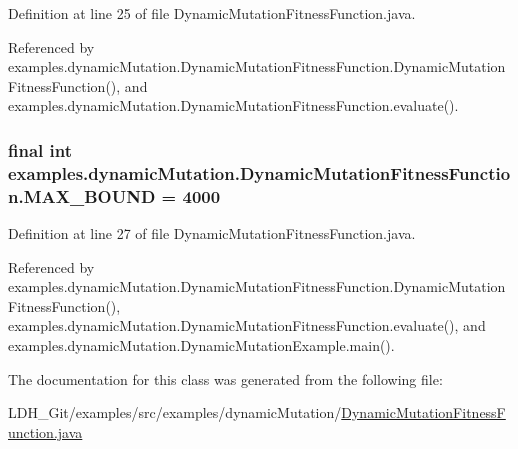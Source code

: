 Definition at line 25 of file Dynamic\-Mutation\-Fitness\-Function.\-java.



Referenced by examples.\-dynamic\-Mutation.\-Dynamic\-Mutation\-Fitness\-Function.\-Dynamic\-Mutation\-Fitness\-Function(), and examples.\-dynamic\-Mutation.\-Dynamic\-Mutation\-Fitness\-Function.\-evaluate().

\hypertarget{classexamples_1_1dynamic_mutation_1_1_dynamic_mutation_fitness_function_a72501ebb1ccd6fcd85c2b480c6c41907}{
\subsubsection[{M\-A\-X\-\_\-\-B\-O\-U\-N\-D}]{\setlength{\rightskip}{0pt plus 5cm}final int examples.\-dynamic\-Mutation.\-Dynamic\-Mutation\-Fitness\-Function.\-M\-A\-X\-\_\-\-B\-O\-U\-N\-D = 4000\hspace{0.3cm}{\ttfamily [static]}}}\label{classexamples_1_1dynamic_mutation_1_1_dynamic_mutation_fitness_function_a72501ebb1ccd6fcd85c2b480c6c41907}


Definition at line 27 of file Dynamic\-Mutation\-Fitness\-Function.\-java.



Referenced by examples.\-dynamic\-Mutation.\-Dynamic\-Mutation\-Fitness\-Function.\-Dynamic\-Mutation\-Fitness\-Function(), examples.\-dynamic\-Mutation.\-Dynamic\-Mutation\-Fitness\-Function.\-evaluate(), and examples.\-dynamic\-Mutation.\-Dynamic\-Mutation\-Example.\-main().



The documentation for this class was generated from the following file\-:\begin{DoxyCompactItemize}
\item 
L\-D\-H\-\_\-\-Git/examples/src/examples/dynamic\-Mutation/\hyperlink{_dynamic_mutation_fitness_function_8java}{Dynamic\-Mutation\-Fitness\-Function.\-java}\end{DoxyCompactItemize}
